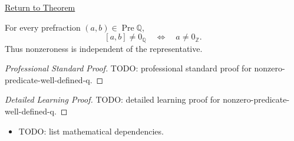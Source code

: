\newpage
{}
\label{prf:nonzero-predicate-well-defined-q}

\begin{remark*}[Return]
\hyperref[lem:nonzero-predicate-well-defined-q]{Return to Theorem}
\end{remark*}

\begin{lemma*}
For every prefraction $(a,b)\in\operatorname{Pre}\mathbb{Q}$,
\[
[a,b]\ne 0_{\mathbb{Q}}
\quad\Longleftrightarrow\quad
a\ne 0_{\mathbb{Z}}.
\]
Thus nonzeroness is independent of the representative.
\end{lemma*}

\begin{proof}[Professional Standard Proof]
\LRAProofBodyStart
TODO: professional standard proof for nonzero-predicate-well-defined-q.
\end{proof}

\begin{proof}[Detailed Learning Proof]
\LRAProofBodyStart
TODO: detailed learning proof for nonzero-predicate-well-defined-q.
\end{proof}

\begin{remark*}
\end{remark*}

\begin{dependencies}
\begin{itemize}
  \item TODO: list mathematical dependencies.
\end{itemize}
\end{dependencies}

\clearpage
